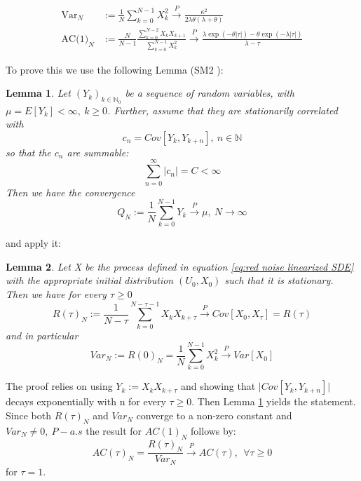 \documentclass[%
thesis=student,%
coverpage=false,%
titlepage=false,%
headmarks=true, %
english,%
font=libertine, %
math=newpxtx, %
BCOR=5mm,%
coverBCOR=11mm%
]{tumbook}
\newtheorem{lemma}{Lemma}
\begin{document}
\begin{subequations}
        \begin{align*}
            \text{Var}_{N} &:= \frac{1}{N}\sum_{k=0}^{N-1}X_{k}^{2} \xrightarrow{P} \frac{\kappa^{2}}{2\lambda\theta(\lambda + \theta)} \\
            \text{AC(1)}_{N} &:= \frac{N}{N-1}\frac{\sum_{k=0}^{N-2}X_{k}X_{k+1}}{\sum_{k=0}^{N-1}X_{k}^{2}} \xrightarrow{P} \frac{\lambda\exp(-\theta\lvert\tau\rvert) - \theta\exp(-\lambda\lvert\tau\rvert)}{\lambda - \tau}
        \end{align*}
\end{subequations}

To prove this we use the following Lemma (SM2 \cite{Morr:2024}):

\begin{lemma}
    Let $(Y_{k})_{k\in \mathbb{N}_{0}}$ be a sequence of random variables, with $\mu = E[Y_{k}] < \infty, \ k \geq 0$. Further, assume that they are stationarily correlated with
    \[
    c_{n} = Cov[Y_{k},Y_{k+n}], \ n \in \mathbb{N}
    \]
    so that the $c_{n}$ are summable:
    \[
    \sum_{n=0}^{\infty}\lvert c_{n} \rvert = C < \infty
    \]
    Then we have the convergence
    \[
    Q_{N} := \frac{1}{N}\sum_{k=0}^{N-1}Y_{k} \xrightarrow{P} \mu, \ N \rightarrow \infty
    \]
    \label{lemma:summable covariance}
\end{lemma}

and apply it:

\begin{lemma}
    Let X be the process defined in equation \ref{eq:red noise linearized SDE} with the appropriate initial distribution $(U_{0},X_{0})$ such that it is stationary. Then we have for every $\tau \geq 0$
    \[
    R(\tau)_{N} := \frac{1}{N-\tau} \sum_{k=0}^{N-\tau -1} X_{k}X_{k+\tau} \xrightarrow{P} Cov[X_{0},X_{\tau}] = R(\tau)
    \]
    and in particular
    \[
    Var_{N} := R(0)_{N} = \frac{1}{N} \sum_{k=0}^{N-1} X_{k}^{2} \xrightarrow{P}Var[X_{0}]
    \]
    \label{lemma: consistent estimator proof}
\end{lemma}

The proof relies on using $Y_{k} := X_{k}X_{k+\tau}$ and showing that $\lvert Cov[Y_{k},Y_{k+n}] \rvert$ decays exponentially with n for every $\tau \geq 0$. Then Lemma \ref{lemma:summable covariance} yields the statement. Since both $R(\tau)_{N}$ and $Var_{N}$ converge to a non-zero constant and $Var_N \neq 0, \ P-a.s$ the result for $AC(1)_{N}$ follows by:
\[
AC(\tau)_N = \frac{R(\tau)_{N}}{Var_{N}} \xrightarrow{P} AC(\tau), \ \ \forall \tau \geq 0
\]
for $\tau = 1$.
\end{document}
